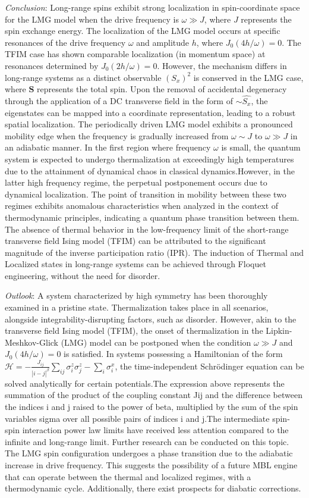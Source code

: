 \documentclass[%
reprint,
superscriptaddress,
amsmath,amssymb,
aps,
prb,
]{revtex4-2}
\begin{document}
	\emph{Conclusion}: Long-range spins exhibit strong localization in spin-coordinate space for the LMG model when the drive frequency is $\omega \gg J$, where $J$ represents the spin exchange energy. The localization of the LMG model occurs at specific resonances of the drive frequency $\omega$ and amplitude $h$, where $J_0(4h/\omega)=0$. The TFIM case has shown comparable localization (in momentum space) at resonances determined by $J_0(2h/\omega)=0$. However, the mechanism differs in long-range systems as a distinct observable $(S_x)^2$ is conserved in the LMG case, where $\mathbf{S}$ represents the total spin. Upon the removal of accidental degeneracy through the application of a DC transverse field in the form of $\sim \hat{S_x}$, the eigenstates can be mapped into a coordinate representation, leading to a robust spatial localization. The periodically driven LMG model exhibits a pronounced mobility edge when the frequency is gradually increased from $\omega \sim J$ to $\omega \gg J$ in an adiabatic manner. In the first region where frequency $\omega$ is small, the quantum system is expected to undergo thermalization at exceedingly high temperatures due to the attainment of dynamical chaos in classical dynamics.However, in the latter high frequency regime, the perpetual postponement occurs due to dynamical localization. The point of transition in mobility between these two regimes exhibits anomalous characteristics when analyzed in the context of thermodynamic principles, indicating a quantum phase transition between them. The absence of thermal behavior in the low-frequency limit of the short-range transverse field Ising model (TFIM) can be attributed to the significant magnitude of the inverse participation ratio (IPR). The induction of Thermal and Localized states in long-range systems can be achieved through Floquet engineering, without the need for disorder.	
	
	\emph{Outlook}: 	
	A system characterized by high symmetry has been thoroughly examined in a pristine state. Thermalization takes place in all scenarios, alongside integrability-disrupting factors, such as disorder. However, akin to the transverse field Ising model (TFIM), the onset of thermalization in the Lipkin-Meshkov-Glick (LMG) model can be postponed when the condition $\omega\gg J$ and $J_0(4h/\omega) = 0$ is satisfied. In systems possessing a Hamiltonian of the form $\mathcal{H} = -\frac{J_{ij}}{|i-j|^\beta} \sum_{ij}\sigma^z_i\sigma^z_j -\sum_i \sigma^x_i$, the time-independent Schrödinger equation can be solved analytically for certain potentials.The expression above represents the summation of the product of the coupling constant Jij and the difference between the indices i and j raised to the power of beta, multiplied by the sum of the spin variables sigma over all possible pairs of indices i and j.The intermediate spin-spin interaction power law limits have received less attention compared to the infinite and long-range limit. Further research can be conducted on this topic. The LMG spin configuration undergoes a phase transition due to the adiabatic increase in drive frequency. This suggests the possibility of a future MBL engine that can operate between the thermal and localized regimes, with a thermodynamic cycle. Additionally, there exist prospects for diabatic corrections. 
	
\end{document}
